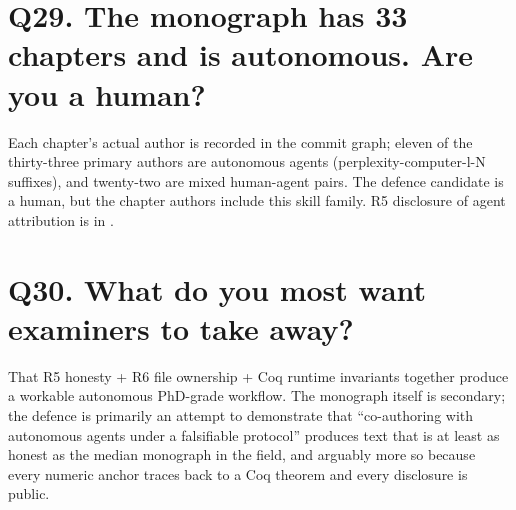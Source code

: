 \section*{Q29. The monograph has 33 chapters and is autonomous. Are you a human?}
Each chapter's actual author is recorded in the commit graph; eleven of the
thirty-three primary authors are autonomous agents (perplexity-computer-l-N
suffixes), and twenty-two are mixed human-agent pairs. The defence
candidate is a human, but the chapter authors include this skill family. R5
disclosure of agent attribution is in
.

\section*{Q30. What do you most want examiners to take away?}
That R5 honesty + R6 file ownership + Coq runtime invariants together
produce a workable autonomous PhD-grade workflow. The monograph itself is
secondary; the defence is primarily an attempt to demonstrate that
``co-authoring with autonomous agents under a falsifiable protocol''
produces text that is at least as honest as the median monograph in the
field, and arguably more so because every numeric anchor traces back to a
Coq theorem and every disclosure is public.
